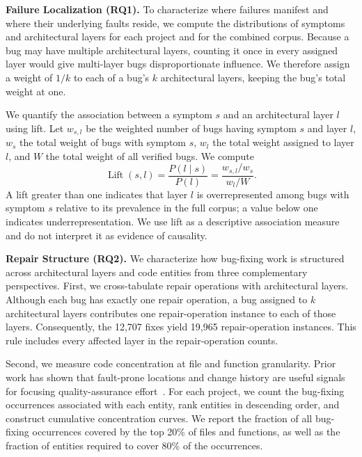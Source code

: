 \textbf{Failure Localization (RQ1).} To characterize where failures manifest and where their underlying faults reside, we compute the distributions of symptoms and architectural layers for each project and for the combined corpus. Because a bug may have multiple architectural layers, counting it once in every assigned layer would give multi-layer bugs disproportionate influence. We therefore assign a weight of $1/k$ to each of a bug's $k$ architectural layers, keeping the bug's total weight at one.

We quantify the association between a symptom $s$ and an architectural layer $l$ using lift. Let $w_{s,l}$ be the weighted number of bugs having symptom $s$ and layer $l$, $w_s$ the total weight of bugs with symptom $s$, $w_l$ the total weight assigned to layer $l$, and $W$ the total weight of all verified bugs. We compute
\begin{equation}
    \operatorname{Lift}(s,l)
    = \frac{P(l\mid s)}{P(l)}
    = \frac{w_{s,l}/w_s}{w_l/W}.
\end{equation}
A lift greater than one indicates that layer $l$ is overrepresented among bugs with symptom $s$ relative to its prevalence in the full corpus; a value below one indicates underrepresentation. We use lift as a descriptive association measure and do not interpret it as evidence of causality.

\textbf{Repair Structure (RQ2).} We characterize how bug-fixing work is structured across architectural layers and code entities from three complementary perspectives. First, we cross-tabulate repair operations with architectural layers. Although each bug has exactly one repair operation, a bug assigned to $k$ architectural layers contributes one repair-operation instance to each of those layers. Consequently, the 12,707 fixes yield 19,965 repair-operation instances. This rule includes every affected layer in the repair-operation counts.

Second, we measure code concentration at file and function granularity. Prior work has shown that fault-prone locations and change history are useful signals for focusing quality-assurance effort~\cite{ostrand2005faultlocation,graves2000changehistory}. For each project, we count the bug-fixing occurrences associated with each entity, rank entities in descending order, and construct cumulative concentration curves. We report the fraction of all bug-fixing occurrences covered by the top 20\% of files and functions, as well as the fraction of entities required to cover 80\% of the occurrences.

